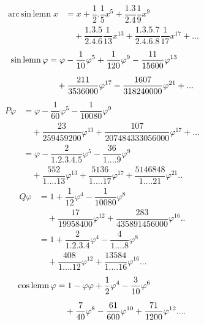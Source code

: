 \[
\begin{aligned}\operatorname{arc\,sin\,lemn}x&=x+\dfrac12.\dfrac15x^5+\dfrac{1.3}{2.4}\dfrac19x^9\\[6pt]&\quad{}+\dfrac{1.3.5}{2.4.6}\dfrac1{13}x^{13}+\dfrac{1.3.5.7}{2.4.6.8}\dfrac1{17}x^{17}+\mathord{.}\mathord{.}\mathord{.}\end{aligned}
\]
\[
\begin{aligned}\operatorname{sin\,lemn}\varphi&=\varphi-\dfrac1{10}\varphi^5+\dfrac1{120}\varphi^9-\dfrac{11}{15600}\varphi^{13}\\[6pt]&\quad{}+\dfrac{211}{3536000}\varphi^{17}-\dfrac{1607}{318240000}\varphi^{21}+\mathord{.}\mathord{.}\mathord{.}\end{aligned}
\]
\[
\begin{aligned}
P\varphi&=\varphi-\dfrac1{60}\varphi^5-\dfrac1{10080}\varphi^9\\[6pt]&\quad{}+\dfrac{23}{259459200}\varphi^{13}+\dfrac{107}{207484333056000}\varphi^{17}+\mathord{.}\mathord{.}\mathord{.}\\[12pt]
&=\varphi-\dfrac2{1.2.3.4.5}\varphi^5-\dfrac{36}{1\mathord{.}\mathord{.}\mathord{.}\mathord{.}9}\varphi^9\\[6pt]&\quad{}+\dfrac{552}{1\mathord{.}\mathord{.}\mathord{.}\mathord{.}13}\varphi^{13}+\dfrac{5136}{1\mathord{.}\mathord{.}\mathord{.}\mathord{.}17}\varphi^{17}+\dfrac{5146848}{1\mathord{.}\mathord{.}\mathord{.}\mathord{.}21}\varphi^{21}\mathord{.}\mathord{.}
\end{aligned}
\]
\[
\begin{aligned}
Q\varphi&=1+\dfrac1{12}\varphi^4-\dfrac1{10080}\varphi^8\\[6pt]&\quad{}+\dfrac{17}{19958400}\varphi^{12}+\dfrac{283}{435891456000}\varphi^{16}\mathord{.}\mathord{.}\\[12pt]
&=1+\dfrac2{1.2.3.4}\varphi^4-\dfrac4{1\mathord{.}\mathord{.}\mathord{.}\mathord{.}8}\varphi^8\\[6pt]&\quad{}+\dfrac{408}{1\mathord{.}\mathord{.}\mathord{.}\mathord{.}12}\varphi^{12}+\dfrac{13584}{1\mathord{.}\mathord{.}\mathord{.}\mathord{.}16}\varphi^{16}\mathord{.}\mathord{.}\mathord{.}
\end{aligned}
\]
\[
\begin{aligned}\operatorname{cos\,lemn}\varphi&=1-\varphi\varphi+\dfrac12\varphi^4-\dfrac3{10}\varphi^6\\[6pt]&\quad{}+\dfrac7{40}\varphi^8-\dfrac{61}{600}\varphi^{10}+\dfrac{71}{1200}\varphi^{12}\mathord{.}\mathord{.}\mathord{.}\mathord{.}\end{aligned}
\]
